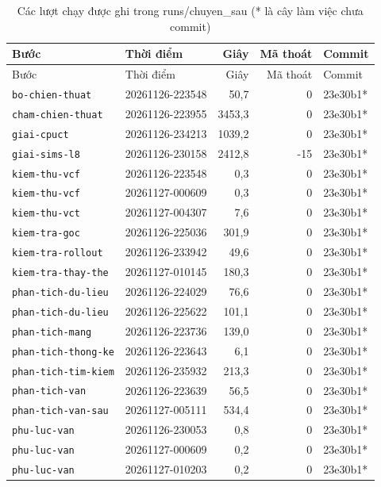 \par{\footnotesize
\renewcommand{\arraystretch}{0.95}
\begin{longtable}{llrrl}
  \caption{Các lượt chạy được ghi trong runs/chuyen\_sau (* là cây làm việc chưa commit)}\label{tab:cs-minh-chung}\\
    \toprule
    Bước & Thời điểm & Giây & Mã thoát & Commit \\
    \midrule
  \endfirsthead
    \toprule
    Bước & Thời điểm & Giây & Mã thoát & Commit \\
    \midrule
  \endhead
    \bottomrule
  \endfoot
    \texttt{bo-chien-thuat} & 20261126-223548 & 50,7 & 0 & 23e30b1* \\
    \texttt{cham-chien-thuat} & 20261126-223955 & 3453,3 & 0 & 23e30b1* \\
    \texttt{giai-cpuct} & 20261126-234213 & 1039,2 & 0 & 23e30b1* \\
    \texttt{giai-sims-l8} & 20261126-230158 & 2412,8 & -15 & 23e30b1* \\
    \texttt{kiem-thu-vcf} & 20261126-223548 & 0,3 & 0 & 23e30b1* \\
    \texttt{kiem-thu-vcf} & 20261127-000609 & 0,3 & 0 & 23e30b1* \\
    \texttt{kiem-thu-vct} & 20261127-004307 & 7,6 & 0 & 23e30b1* \\
    \texttt{kiem-tra-goc} & 20261126-225036 & 301,9 & 0 & 23e30b1* \\
    \texttt{kiem-tra-rollout} & 20261126-233942 & 49,6 & 0 & 23e30b1* \\
    \texttt{kiem-tra-thay-the} & 20261127-010145 & 180,3 & 0 & 23e30b1* \\
    \texttt{phan-tich-du-lieu} & 20261126-224029 & 76,6 & 0 & 23e30b1* \\
    \texttt{phan-tich-du-lieu} & 20261126-225622 & 101,1 & 0 & 23e30b1* \\
    \texttt{phan-tich-mang} & 20261126-223736 & 139,0 & 0 & 23e30b1* \\
    \texttt{phan-tich-thong-ke} & 20261126-223643 & 6,1 & 0 & 23e30b1* \\
    \texttt{phan-tich-tim-kiem} & 20261126-235932 & 213,3 & 0 & 23e30b1* \\
    \texttt{phan-tich-van} & 20261126-223639 & 56,5 & 0 & 23e30b1* \\
    \texttt{phan-tich-van-sau} & 20261127-005111 & 534,4 & 0 & 23e30b1* \\
    \texttt{phu-luc-van} & 20261126-230053 & 0,8 & 0 & 23e30b1* \\
    \texttt{phu-luc-van} & 20261127-000609 & 0,2 & 0 & 23e30b1* \\
    \texttt{phu-luc-van} & 20261127-010203 & 0,2 & 0 & 23e30b1* \\
\end{longtable}
}
